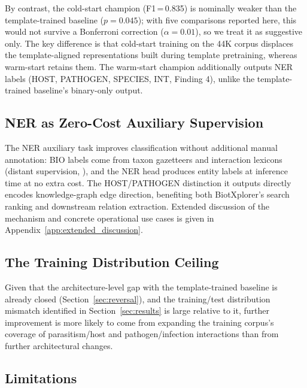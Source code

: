 \documentclass[11pt]{article}
\begin{document}
By contrast, the cold-start champion (F1\,=\,0.835) is nominally weaker
than the template-trained baseline ($p{=}0.045$); with five comparisons
reported here, this would not survive a Bonferroni correction
($\alpha{=}0.01$), so we treat it as suggestive only.
The key difference is that cold-start training on the 44K corpus
displaces the template-aligned representations built during template
pretraining, whereas warm-start retains them. The warm-start champion
additionally outputs NER labels (HOST, PATHOGEN, SPECIES, INT, Finding 4),
unlike the template-trained baseline's binary-only output.

\subsection{NER as Zero-Cost Auxiliary Supervision}
\label{sec:zerocost}

The NER auxiliary task improves classification without additional manual
annotation: BIO labels \citep{ramshaw1995text} come from taxon gazetteers
and interaction lexicons (distant supervision, \citealt{mintz2009distant}),
and the NER head produces entity labels at inference time at no extra
cost. The HOST/PATHOGEN distinction it outputs directly encodes
knowledge-graph edge direction, benefiting both BiotXplorer's
search ranking and downstream relation extraction. Extended discussion
of the mechanism and concrete operational use cases is given in
Appendix~\ref{app:extended_discussion}.

\subsection{The Training Distribution Ceiling}

Given that the architecture-level gap with the template-trained baseline is
already closed (Section~\ref{sec:reversal}), and the training/test
distribution mismatch identified in Section~\ref{sec:results} is large
relative to it, further improvement is more likely to come from
expanding the training corpus's coverage of parasitism/host and
pathogen/infection interactions than from further architectural changes.

\subsection{Limitations}
\label{sec:limitations}
\end{document}
